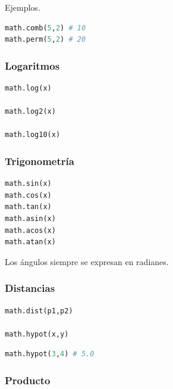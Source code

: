 Ejemplos.

\begin{lstlisting}[language=Python]
math.comb(5,2) # 10
math.perm(5,2) # 20
\end{lstlisting}

\vspace{0.3cm}

\subsubsection{Logaritmos}

\begin{lstlisting}[language=Python]
math.log(x)

math.log2(x)

math.log10(x)
\end{lstlisting}

\vspace{0.3cm}

\subsubsection{Trigonometría}

\begin{lstlisting}[language=Python]
math.sin(x)
math.cos(x)
math.tan(x)
math.asin(x)
math.acos(x)
math.atan(x)
\end{lstlisting}

Los ángulos siempre se expresan en radianes.

\vspace{0.3cm}

\subsubsection{Distancias}

\begin{lstlisting}[language=Python]
math.dist(p1,p2)

math.hypot(x,y)
\end{lstlisting}

\begin{lstlisting}[language=Python]
math.hypot(3,4) # 5.0
\end{lstlisting}

\vspace{0.3cm}

\subsubsection{Producto}

